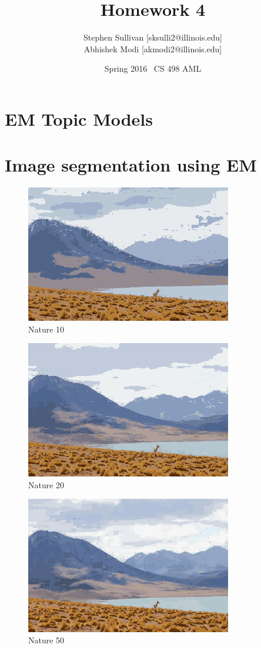 \documentclass{article}
\title{Homework 4}
\author{Stephen Sullivan [sksulli2@illinois.edu]\\ Abhishek Modi [akmodi2@illinois.edu] }
\date{Spring 2016 \textbar\  CS 498 AML }
\begin{document}
\maketitle

\section{EM Topic Models}

\section{Image segmentation using EM}

\begin{figure}[ht!]
	\centering
	\caption{Nature 10}
	\includegraphics[width=90mm]{nature-em-k10-20.png}
\end{figure}

\begin{figure}[ht!]
	\centering
	\caption{Nature 20}
	\includegraphics[width=90mm]{nature-em-k20-28.png}
\end{figure}

\begin{figure}[ht!]
	\centering
	\caption{Nature 50}
	\includegraphics[width=90mm]{nature-em-k50-48.png}
\end{figure}
\end{document}

